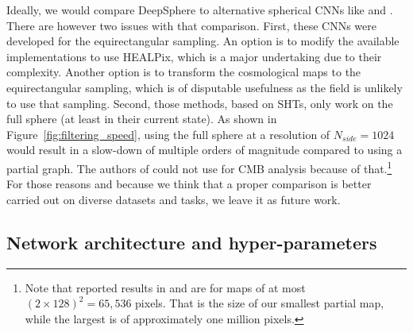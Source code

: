 \documentclass[final,twocolumn,3p,times,sort&compress]{elsarticle}
\newcommand{\figref}[1]{Figure~\ref{fig:#1}}
\newcommand{\1}{\b{1}}              %
\newcommand{\0}{\b{0}}              %
\begin{document}
Ideally, we would compare DeepSphere to alternative spherical CNNs like \citep{cohen2018sphericalcnn} and \citep{esteves2017sphericalcnn}.
There are however two issues with that comparison.
First, these CNNs were developed for the equirectangular sampling.
An option is to modify the available implementations to use HEALPix, which is a major undertaking due to their complexity.
Another option is to transform the cosmological maps to the equirectangular sampling, which is of disputable usefulness as the field is unlikely to use that sampling.
Second, those methods, based on SHTs, only work on the full sphere (at least in their current state).
As shown in \figref{filtering_speed}, using the full sphere at a resolution of $N_{side} = 1024$ would result in a slow-down of multiple orders of magnitude compared to using a partial graph.
The authors of \citep{he2018cmbdl} could not use \citep{cohen2018sphericalcnn} for CMB analysis because of that.\footnote{Note that reported results in \citep{cohen2018sphericalcnn} and \citep{esteves2017sphericalcnn} are for maps of at most $(2 \times 128)^2 = 65,536$ pixels.
That is the size of our smallest partial map, while the largest is of approximately one million pixels.}
For those reasons and because we think that a proper comparison is better carried out on diverse datasets and tasks, we leave it as future work.

\subsection{Network architecture and hyper-parameters}
\label{sec:hyper_parameters}
\end{document}
